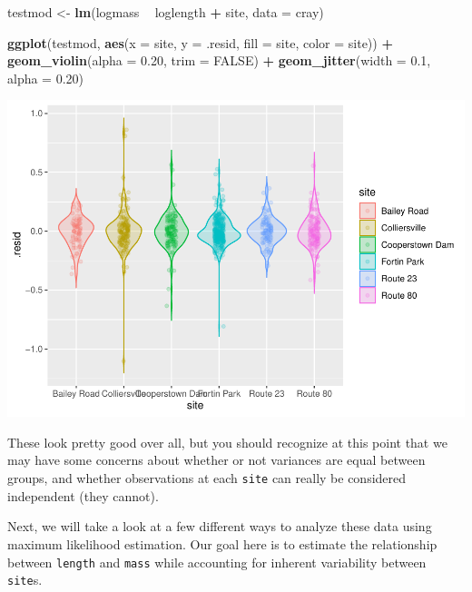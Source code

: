 \documentclass[
]{book}
\newenvironment{Shaded}{\begin{snugshade}}{\end{snugshade}}
\newcommand{\DataTypeTok}[1]{\textcolor[rgb]{0.13,0.29,0.53}{#1}}
\newcommand{\FloatTok}[1]{\textcolor[rgb]{0.00,0.00,0.81}{#1}}
\newcommand{\KeywordTok}[1]{\textcolor[rgb]{0.13,0.29,0.53}{\textbf{#1}}}
\newcommand{\NormalTok}[1]{#1}
\newcommand{\OperatorTok}[1]{\textcolor[rgb]{0.81,0.36,0.00}{\textbf{#1}}}
\newcommand{\OtherTok}[1]{\textcolor[rgb]{0.56,0.35,0.01}{#1}}
\newcommand{\StringTok}[1]{\textcolor[rgb]{0.31,0.60,0.02}{#1}}
\begin{document}
\begin{Shaded}
\begin{Highlighting}[]
\NormalTok{testmod <-}\StringTok{ }\KeywordTok{lm}\NormalTok{(logmass }\OperatorTok{~}\StringTok{ }\NormalTok{loglength }\OperatorTok{+}\StringTok{ }\NormalTok{site, }\DataTypeTok{data =}\NormalTok{ cray)}

\KeywordTok{ggplot}\NormalTok{(testmod, }\KeywordTok{aes}\NormalTok{(}\DataTypeTok{x =}\NormalTok{ site, }\DataTypeTok{y =}\NormalTok{ .resid, }\DataTypeTok{fill =}\NormalTok{ site, }\DataTypeTok{color =}\NormalTok{ site)) }\OperatorTok{+}
\StringTok{  }\KeywordTok{geom_violin}\NormalTok{(}\DataTypeTok{alpha =} \FloatTok{0.20}\NormalTok{, }\DataTypeTok{trim =} \OtherTok{FALSE}\NormalTok{) }\OperatorTok{+}
\StringTok{  }\KeywordTok{geom_jitter}\NormalTok{(}\DataTypeTok{width =} \FloatTok{0.1}\NormalTok{, }\DataTypeTok{alpha =} \FloatTok{0.20}\NormalTok{)}
\end{Highlighting}
\end{Shaded}

\includegraphics{worstr_files/figure-latex/unnamed-chunk-375-1.pdf}

These look pretty good over all, but you should recognize at this point that we may have some concerns about whether or not variances are equal between groups, and whether observations at each \texttt{site} can really be considered independent (they cannot).

Next, we will take a look at a few different ways to analyze these data using maximum likelihood estimation. Our goal here is to estimate the relationship between \texttt{length} and \texttt{mass} while accounting for inherent variability between \texttt{site}s.
\end{document}
